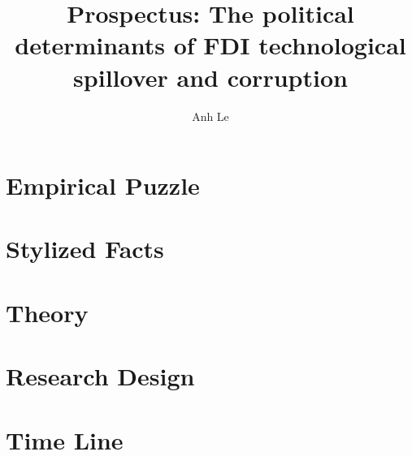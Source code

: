 \documentclass[12pt]{article}
\title{Prospectus: The political determinants of FDI technological spillover and corruption}
\author{Anh Le}
\begin{document}
\maketitle

\section{Empirical Puzzle}


\section{Stylized Facts}



\section{Theory}


\section{Research Design}






\section{Time Line}

\clearpage


\end{document}
